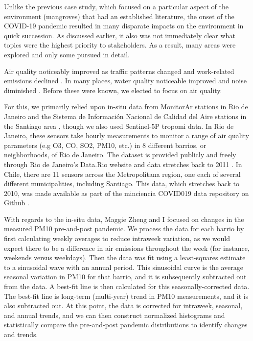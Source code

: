 Unlike the previous case study, which focused on a particular aspect of the environment (mangroves) that had an established literature, the onset of the COVID-19 pandemic resulted in many disparate impacts on the environment in quick succession. As discussed earlier, it also was not immediately clear what topics were the highest priority to stakeholders. As a result, many areas were explored and only some pursued in detail.

Air quality noticeably improved as traffic patterns changed and work-related emissions declined \cite{isaifanDramaticImpactCoronavirus2020}. In many places, water quality noticeable improved and noise diminished \cite{aroraCoronavirusLockdownHelped2020}. Before these were known, we elected to focus on air quality.

For this, we primarily relied upon in-situ data from MonitorAr stations in Rio de Janeiro  and the Sistema de Información Nacional de Calidad del Aire stations in the Santiago area , though we also used Sentinel-5P \ac{tropomi} data. In Rio de Janeiro, these sensors take hourly measurements to monitor a range of air quality parameters (e.g O3, CO, SO2, PM10, etc.) in 8 different barrios, or neighborhoods, of Rio de Janeiro. The dataset is provided publicly and freely through Rio de Janeiro's Data.Rio website and data stretches back to 2011 \cite{institutopereirapassosDadosHorariosMonitoramento2018}. In Chile, there are  11 sensors across the Metropolitana region, one each of several different municipalities, including Santiago. This data, which stretches back to 2010, was made available as part of the \ac{minciencia} COVID019 data repository on Github \cite{ministeriodecienciatecnologiaconocimientoeinnovacionDatosCOVID192021}.

With regards to the in-situ data, Maggie Zheng and I focused on changes in the measured PM10 pre-and-post pandemic. We process the data for each barrio by first calculating weekly averages to reduce intraweek variation, as we would expect there to be a difference in air emissions throughout the week (for instance, weekends versus weekdays). Then the data was fit using a least-squares estimate to a sinusoidal wave with an annual period. This sinusoidal curve is the average seasonal variation in PM10 for that barrio, and it is subsequently subtracted out from the data. A best-fit line is then calculated for this seasonally-corrected data. The best-fit line is long-term (multi-year) trend in PM10 measurements, and it is also subtracted out. At this point, the data is corrected for intraweek, seasonal, and annual trends, and we can then construct normalized histograms and statistically compare the pre-and-post pandemic distributions to identify changes and trends. 

